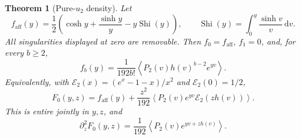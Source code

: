 \documentclass[11pt]{article}
\numberwithin{equation}{section}
\newtheorem{theorem}{Theorem}[section]
\theoremstyle{definition}\newtheorem{definition}[theorem]{Definition}
\theoremstyle{remark}\newtheorem{remark}[theorem]{Remark}
\newcommand{\avg}[1]{\left\langle #1\right\rangle}
\newcommand{\dd}{\,\mathrm d}
\newcommand{\Shi}{\operatorname{Shi}}
\newcommand{\Erem}{\mathcal E_2}
\begin{document}
\begin{theorem}[Pure-$u_2$ density]\label{thm:quadratic}
Let
\begin{equation}\label{eq:faff}
 f_{\mathrm{aff}}(y)=\frac12\left(
 \cosh y+\frac{\sinh y}{y}-y\Shi(y)\right),
 \qquad \Shi(y)=\int_0^y\frac{\sinh v}{v}\dd v.
\end{equation}
All singularities displayed at zero are removable. Then $f_0=f_{\mathrm{aff}}$,
$f_1=0$, and, for every $b\ge2$,
\begin{equation}\label{eq:fb-density}
 \boxed{\displaystyle f_b(y)=\frac1{192b!}
  \avg{P_2(v)h(v)^{b-2}e^{yv}}.}
\end{equation}
Equivalently, with
$\Erem(x)=(e^x-1-x)/x^2$ and $\Erem(0)=1/2$,
\begin{equation}\label{eq:F0-compact}
 F_0(y,z)=f_{\mathrm{aff}}(y)+\frac{z^2}{192}
 \avg{P_2(v)e^{yv}\Erem(zh(v))}.
\end{equation}
This is entire jointly in $y,z$, and
\begin{equation}\label{eq:F0zz}
 \partial_z^2F_0(y,z)=\frac1{192}\avg{P_2(v)e^{yv+zh(v)}}.
\end{equation}
\end{theorem}
\end{document}
